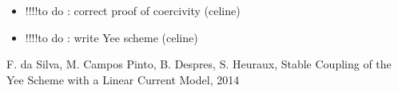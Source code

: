 \documentclass[proc]{edpsmath}
\begin{document}
\begin{itemize}
\item !!!!to do : correct proof of coercivity (celine)
\item !!!!to do : write Yee scheme 			(celine)

\end{itemize}






\begin{thebibliography}{99}
 F. da Silva, M. Campos Pinto, B. Despres, S. Heuraux, Stable Coupling of the Yee Scheme with a Linear Current Model,
2014
\end{thebibliography}
\end{document}
